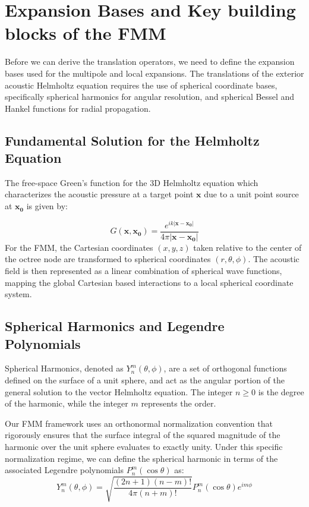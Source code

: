 \section{Expansion Bases and Key building blocks of the \ac{FMM}} \label{sec:expansion-bases}

Before we can derive the translation operators, we need to define the expansion bases used for the multipole and local expansions. The translations of the exterior acoustic Helmholtz equation requires the use of spherical coordinate bases, specifically spherical harmonics for angular resolution, and spherical Bessel and Hankel functions for radial propagation.

\subsection{Fundamental Solution for the Helmholtz Equation}
The free-space Green's function for the 3D Helmholtz equation which characterizes the acoustic pressure at a target point $\mathbf{x}$ due to a unit point source at $\mathbf{x_0}$ is given by:

\begin{equation}\label{green-function}
    G(\mathbf{x}, \mathbf{x_0}) = \frac{e^{ik|\mathbf{x} - \mathbf{x_0}|}}{4\pi |\mathbf{x} - \mathbf{x_0}|}
\end{equation}
For the \ac{FMM}, the Cartesian coordinates $(x, y, z)$ taken relative to the center of the octree node are transformed to spherical coordinates $(r, \theta, \phi)$. The acoustic field is then represented as a linear combination of spherical wave functions, mapping the global Cartesian based interactions to a local spherical coordinate system.

\subsection{Spherical Harmonics and Legendre Polynomials}
Spherical Harmonics, denoted as $Y_n^m(\theta, \phi)$, are a set of orthogonal functions defined on the surface of a unit sphere, and act as the angular portion of the general solution to the vector Helmholtz equation. The integer $n \geq 0 $ is the degree of the harmonic, while the integer $m$ represents the order.

Our \ac{FMM} framework uses an orthonormal normalization convention that rigorously ensures that the surface integral of the squared magnitude of the harmonic over the unit sphere evaluates to exactly unity. Under this specific normalization regime, we can define the spherical harmonic in terms of the associated Legendre polynomials $P_n^m(\cos \theta)$ as:
\begin{equation}\label{spherical-harmonic}
    Y_n^m(\theta, \phi) = \sqrt{\frac{(2n + 1)(n - m)!}{4\pi (n + m)!}} P_n^m(\cos \theta) e^{im\phi}
\end{equation}

